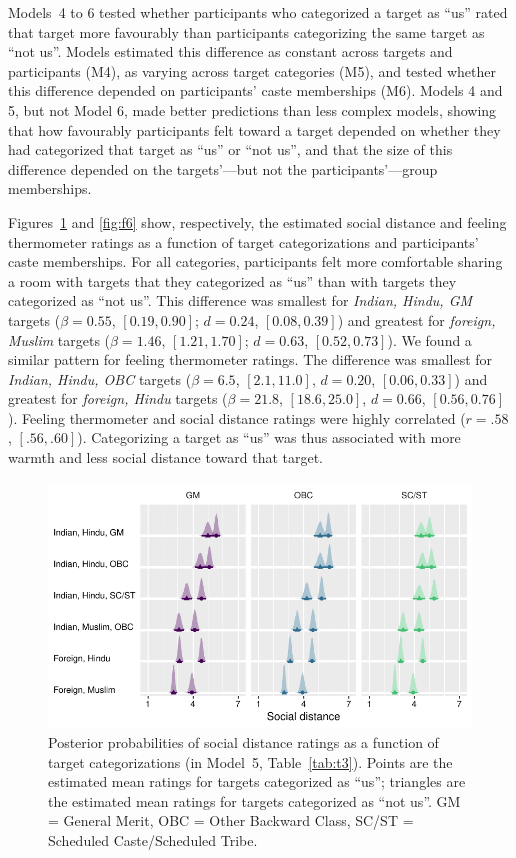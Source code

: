 \documentclass[12pt, a4paper]{article}
\begin{document}
Models~4 to 6 tested whether participants who categorized a target as ``us'' rated that target more favourably than participants categorizing the same target as ``not us''. Models estimated this difference as constant across targets and participants (M4), as varying across target categories (M5), and tested whether this difference depended on participants' caste memberships (M6). Models 4 and 5, but not Model 6, made better predictions than less complex models, showing that how favourably participants felt toward a target depended on whether they had categorized that target as ``us'' or ``not us'', and that the size of this difference depended on the targets'---but not the participants'---group memberships.

Figures~\ref{fig:f5} and \ref{fig:f6} show, respectively, the estimated social distance and feeling thermometer ratings as a function of target categorizations and participants' caste memberships. For all categories, participants felt more comfortable sharing a room with targets that they categorized as ``us'' than with targets they categorized as ``not us''.  This difference was smallest for \emph{Indian, Hindu, GM} targets ($\beta = 0.55$, $[0.19, 0.90]$; $d = 0.24$, $[0.08, 0.39]$) and greatest for \emph{foreign, Muslim} targets ($\beta = 1.46$, $[1.21, 1.70]$; $d = 0.63$, $[0.52, 0.73]$). We found a similar pattern for feeling thermometer ratings. The difference was smallest for \emph{Indian, Hindu, OBC} targets ($\beta = 6.5$, $[2.1, 11.0]$, $d = 0.20$, $[0.06, 0.33]$) and greatest for \emph{foreign, Hindu} targets ($\beta = 21.8$, $[18.6, 25.0]$, $d = 0.66$, $[0.56, 0.76]$). Feeling thermometer and social distance ratings were highly correlated ($r = .58$, $[.56, .60]$). Categorizing a target as ``us'' was thus associated with more warmth and less social distance toward that target.

\begin{figure}
\centering
\includegraphics[scale=1]{../figures/figure-5}
\caption{
Posterior probabilities of social distance ratings as a function of target categorizations (in Model~5, Table~\ref{tab:t3}). Points are the estimated mean ratings for targets categorized as ``us''; triangles are the estimated mean ratings for targets categorized as ``not us''. GM = General Merit, OBC = Other Backward Class, SC/ST = Scheduled Caste/Scheduled Tribe.
}
\label{fig:f5}
\end{figure}
\end{document}
